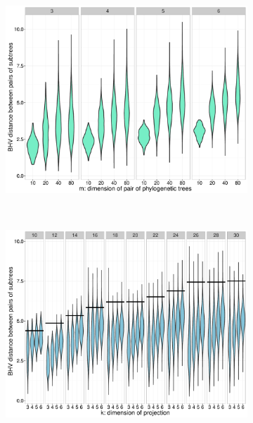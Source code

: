 \documentclass[a4paper,11pt]{article}
\begin{document}
\begin{figure}
    \begin{subfigure}{0.5\linewidth}
    \centering
    \includegraphics[width=\linewidth]{../figures/dimred_pwdist_vs_M.pdf}
    \end{subfigure}
    ~
    \begin{subfigure}{0.5\linewidth}
    \centering
    \includegraphics[width=\linewidth]{../figures/dimred_pwdist_vs_K.pdf}
    \end{subfigure}
    

\end{figure}
\end{document}
